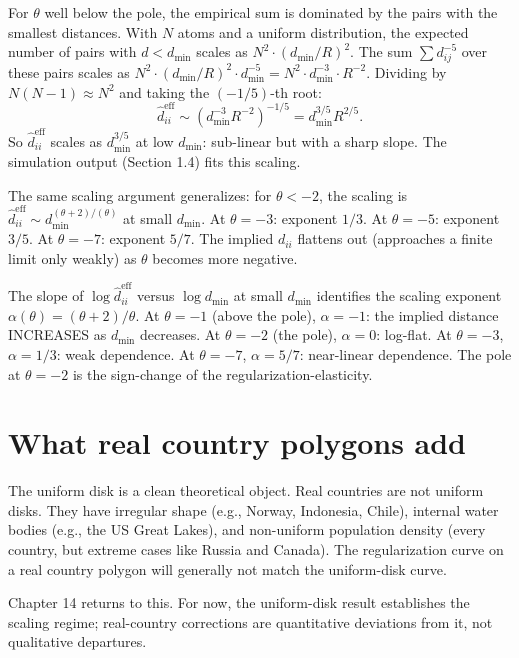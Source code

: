 \documentclass[11pt,letterpaper,oneside]{book}
\theoremstyle{definition}
\theoremstyle{remark}
\newcommand{\eff}{\mathrm{eff}}
\begin{document}
For $\theta$ well below the pole, the empirical sum is dominated by the
pairs with the smallest distances. With $N$ atoms and a uniform
distribution, the expected number of pairs with $d < d_{\min}$ scales
as $N^2 \cdot (d_{\min}/R)^2$. The sum
$\sum d_{ij}^{-5}$ over these pairs scales as
$N^2 \cdot (d_{\min}/R)^2 \cdot d_{\min}^{-5} = N^2 \cdot d_{\min}^{-3} \cdot R^{-2}$.
Dividing by $N(N-1) \approx N^2$ and taking the $(-1/5)$-th root:
$$\hat{d}_{ii}^{\eff} \sim \left(d_{\min}^{-3} R^{-2}\right)^{-1/5} = d_{\min}^{3/5} R^{2/5}.$$
So $\hat{d}_{ii}^{\eff}$ scales as $d_{\min}^{3/5}$ at low $d_{\min}$:
sub-linear but with a sharp slope. The simulation output (Section 1.4)
fits this scaling.

The same scaling argument generalizes: for $\theta < -2$, the scaling is
$\hat{d}_{ii}^{\eff} \sim d_{\min}^{(\theta+2)/(\theta)}$ at small
$d_{\min}$. At $\theta = -3$: exponent $1/3$. At $\theta = -5$: exponent
$3/5$. At $\theta = -7$: exponent $5/7$. The implied $d_{ii}$ flattens
out (approaches a finite limit only weakly) as $\theta$ becomes more
negative.

\begin{insight}
The slope of $\log \hat{d}_{ii}^{\eff}$ versus $\log d_{\min}$ at small
$d_{\min}$ identifies the scaling exponent
$\alpha(\theta) = (\theta + 2)/\theta$. At $\theta = -1$ (above the pole),
$\alpha = -1$: the implied distance INCREASES as $d_{\min}$ decreases.
At $\theta = -2$ (the pole), $\alpha = 0$: log-flat. At $\theta = -3$,
$\alpha = 1/3$: weak dependence. At $\theta = -7$, $\alpha = 5/7$:
near-linear dependence. The pole at $\theta = -2$ is the sign-change
of the regularization-elasticity.
\end{insight}

\section{What real country polygons add}

The uniform disk is a clean theoretical object. Real countries are not
uniform disks. They have irregular shape (e.g., Norway, Indonesia, Chile),
internal water bodies (e.g., the US Great Lakes), and non-uniform
population density (every country, but extreme cases like Russia and
Canada). The regularization curve on a real country polygon will
generally not match the uniform-disk curve.

Chapter 14 returns to this. For now, the uniform-disk result establishes
the scaling regime; real-country corrections are quantitative deviations
from it, not qualitative departures.
\end{document}
